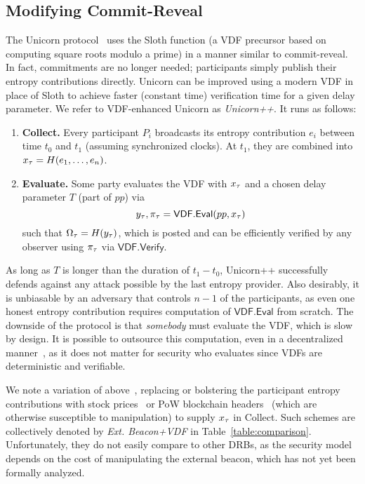 \subsection{Modifying Commit-Reveal}
\label{subsection:modifying-commit-reveal}
The Unicorn protocol~\cite{lenstra2015random} uses the Sloth function (a VDF precursor based on computing square roots modulo a prime) in a manner similar to commit-reveal. In fact, commitments are no longer needed; participants simply publish their entropy contributions directly. Unicorn can be improved using a modern VDF in place of Sloth to achieve faster (constant time) verification time for a given delay parameter. We refer to VDF-enhanced Unicorn as \textit{Unicorn++}. It runs as follows:
\begin{enumerate}
    \item \textbf{Collect.} Every participant $P_i$ broadcasts its entropy contribution $e_i$ between time $t_0$ and $t_1$ (assuming synchronized clocks). At $t_1$, they are combined into $x_\tau = H(e_1,\ldots, e_n)$.
    \item \textbf{Evaluate.} Some party evaluates the VDF with $x_\tau$ and a chosen delay parameter $T$ (part of $pp$) via
    $$y_\tau, \pi_\tau = \mathsf{VDF.Eval}(pp, x_\tau)$$
    such that $\Omega_\tau = H(y_\tau)$, which is posted and can be efficiently verified by any observer using $\pi_\tau$ via $\mathsf{VDF.Verify}$.
\end{enumerate}
As long as $T$ is longer than the duration of $t_1 - t_0$, Unicorn++ successfully defends against any attack possible by the last entropy provider. Also desirably, it is unbiasable by an adversary that controls $n - 1$ of the participants, as even one honest entropy contribution requires computation of $\mathsf{VDF.Eval}$ from scratch. The downside of the protocol is that \emph{somebody} must evaluate the VDF, which is slow by design. It is possible to outsource this computation, even in a decentralized manner~\cite{thyagarajan2021opensquare}, as it does not matter for security who evaluates since VDFs are deterministic and verifiable. %

We note a variation of above~\cite{bunz2017proofs, bonneau2015bitcoin}, replacing or bolstering the participant entropy contributions with  stock prices~\cite{clark2010use} or PoW blockchain headers~\cite{nakamoto2008bitcoin, bentov2016bitcoin, han2020randchain} (which are otherwise susceptible to manipulation) to supply $x_\tau$ in Collect. Such schemes are collectively denoted by \textit{Ext. Beacon+VDF} in Table~\ref{table:comparison}.
Unfortunately, they do not easily compare to other DRBs, as the security model depends on the cost of manipulating the external beacon, which has not yet been formally analyzed.

